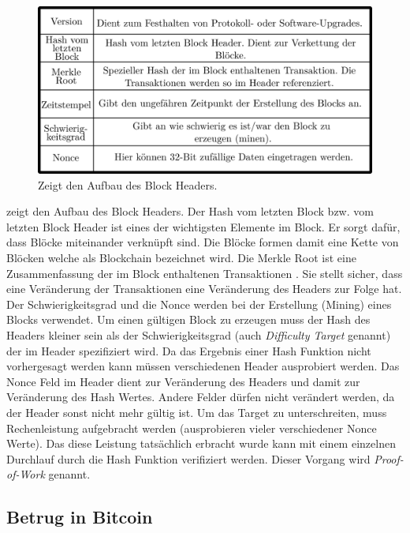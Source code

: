 \documentclass[ngerman,runningheads,a4paper]{llncs}[2018/03/10]
\begin{document}
\begin{figure}
  \centering
  \includegraphics[width=.8\textwidth]{grafiken/tableBlock.png}
  \caption{Zeigt den Aufbau des Block Headers.}
  \label{fig:blockTable}
\end{figure}

 zeigt den Aufbau des Block Headers. Der Hash vom letzten Block bzw. vom letzten Block Header ist eines der wichtigsten Elemente im Block. Er sorgt dafür, dass Blöcke miteinander verknüpft sind. Die Blöcke formen damit eine Kette von Blöcken welche als Blockchain bezeichnet wird. Die Merkle Root ist eine Zusammenfassung der im Block enthaltenen Transaktionen \citep{bitcoinbook}. Sie stellt sicher, dass eine Veränderung der Transaktionen eine Veränderung des Headers zur Folge hat. Der Schwierigkeitsgrad und die Nonce werden bei der Erstellung (Mining) eines Blocks verwendet. Um einen gültigen Block zu erzeugen muss der Hash des Headers kleiner sein als der Schwierigkeitsgrad (auch \textit{Difficulty Target} genannt) der im Header spezifiziert wird. Da das Ergebnis einer Hash Funktion nicht vorhergesagt werden kann müssen verschiedenen Header ausprobiert werden. Das Nonce Feld im Header dient zur Veränderung des Headers und damit zur Veränderung des Hash Wertes. Andere Felder dürfen nicht verändert werden, da der Header sonst nicht mehr gültig ist. Um das Target zu unterschreiten, muss Rechenleistung aufgebracht werden (ausprobieren vieler verschiedener Nonce Werte). Das diese Leistung tatsächlich erbracht wurde kann mit einem einzelnen Durchlauf durch die Hash Funktion verifiziert werden. Dieser Vorgang wird \textit{Proof-of-Work} genannt.

\subsection{Betrug in Bitcoin}\label{sec:betrug}
\end{document}
